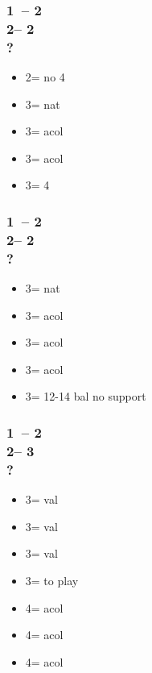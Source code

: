 \documentclass[12pt, a4paper]{report}
\begin{document}
\begin{bidpage}
\subsubsection*{1\clubs\ -- 2\clubs\\
                2\diams -- 2\spades\\
                ?}
\begin{itemize}
    \item 2\nt = no 4\spades
    \item 3\clubs = nat \clubs
    \item 3\diams = acol
    \item 3\hearts = acol
    \item 3\spades = 4\spades
\end{itemize}
\end{bidpage}

\begin{bidpage}
\subsubsection*{1\clubs\ -- 2\clubs\\
                2\diams -- 2\nt\\
                ?}
\begin{itemize}
    \item 3\clubs = nat \clubs
    \item 3\diams = acol
    \item 3\hearts = acol
    \item 3\spades = acol
    \item 3\nt = 12-14 bal no \clubs support
\end{itemize}
\end{bidpage}


\begin{bidpage}
\subsubsection*{1\clubs\ -- 2\clubs\\
                2\diams -- 3\clubs\\
                ?}
\begin{itemize}
    \item 3\diams = val
    \item 3\hearts = val
    \item 3\spades = val
    \item 3\nt = to play
    \item 4\clubs = acol \diams
    \item 4\diams = acol \hearts
    \item 4\hearts = acol \spades
\end{itemize}
\end{bidpage}
\end{document}
